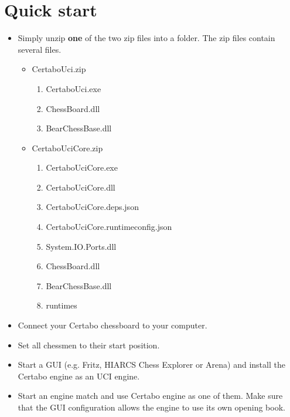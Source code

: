 \documentclass[11pt,a4paper]{article}
\begin{document}
\pagebreak

\section{Quick start}
\begin{itemize}
	\item Simply unzip \textbf{one} of the two zip files into a folder. The zip files contain several files.
    \begin{itemize}
		\item CertaboUci.zip
      	\begin{enumerate}
  		 	\item CertaboUci.exe
			\item ChessBoard.dll
			\item BearChessBase.dll
		\end{enumerate}
	    \item CertaboUciCore.zip
		   \begin{enumerate}
			   	\item CertaboUciCore.exe
				\item CertaboUciCore.dll
				\item CertaboUciCore.deps.json
				\item CertaboUciCore.runtimeconfig.json
				\item System.IO.Ports.dll
				\item ChessBoard.dll
				\item BearChessBase.dll
				\item runtimes
		   \end{enumerate}
    \end{itemize}
	\item Connect your Certabo chessboard to your computer.
	\item Set all chessmen to their start position.
	\item Start a GUI (e.g. Fritz, HIARCS Chess Explorer or Arena) and install the Certabo engine as an UCI engine.
	\item Start an engine match and use Certabo engine as one of them. Make sure that the GUI configuration allows the engine to use its own opening book.
\end{itemize}
\end{document}
